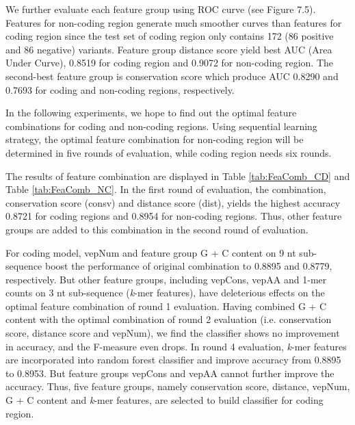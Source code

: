 \documentclass[a4paper,nohyper,nobib,openany,justified]{tufte-book}
\begin{document}
\begin{fullwidth}
We further evaluate each feature group using ROC curve (see Figure 7.5). Features for non-coding region generate much smoother curves than features for coding region since the test set of coding region only contains 172 (86 positive and 86 negative) variants. Feature group distance score yield best AUC (Area Under Curve), 0.8519 for coding region and 0.9072 for non-coding region. The second-best feature group is conservation score which produce AUC 0.8290 and 0.7693 for coding and non-coding regions, respectively.

In the following experiments, we hope to find out the optimal feature combinations for coding and non-coding regions. Using sequential learning strategy, the optimal feature combination for non-coding region will be determined in five rounds of evaluation, while coding region needs six rounds.

The results of feature combination are displayed in Table \ref{tab:FeaComb_CD} and Table \ref{tab:FeaComb_NC}. In the first round of evaluation, the combination, conservation score (consv) and distance score (dist), yields the highest accuracy 0.8721 for coding regions and 0.8954 for non-coding regions. Thus, other feature groups are added to this combination in the second round of evaluation.

For coding model, vepNum and feature group G + C content on 9 nt sub-sequence boost the performance of original combination to 0.8895 and 0.8779, respectively. But other feature groups, including vepCons, vepAA and 1-mer counts on 3 nt sub-sequence (\emph{k}-mer features), have deleterious effects on the optimal feature combination of round 1 evaluation. Having combined G + C content with the optimal combination of round 2 evaluation (i.e. conservation score, distance score and vepNum), we find the classifier shows no improvement in accuracy, and the F-measure even drops. In round 4 evaluation, \emph{k}-mer features are incorporated into random forest classifier and improve accuracy from 0.8895 to 0.8953. But feature groups vepCons and vepAA cannot further improve the accuracy. Thus, five feature groups, namely conservation score, distance, vepNum, G + C content and \emph{k}-mer features, are selected to build classifier for coding region.


\end{fullwidth}
\end{document}
